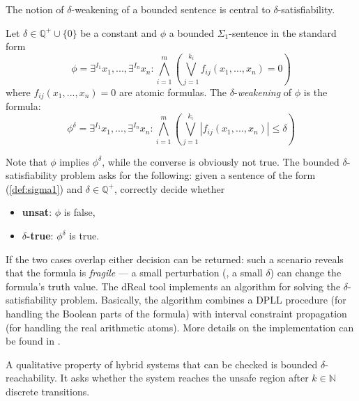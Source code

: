 The notion of $\delta$-weakening \cite{DBLP:conf/lics/GaoAC12} of a bounded sentence is central
to $\delta$-satisfiability.
\begin{definition}
Let $\delta \in \mathbb{Q^+} \cup \{0\}$ be a constant and $\phi$ a bounded $\Sigma_1$-sentence 
in the standard form 
\begin{equation} \label{def:sigma1}
\phi = \exists^{I_{1}} x_{1}, ..., \exists^{I_{n}} x_{n}: \bigwedge^{m}_{i = 1}(\bigvee^{k_i}_{j = 1} f_{ij}(x_{1}, ..., x_{n}) = 0)
\end{equation}
where $f_{ij}(x_{1}, ..., x_{n}) = 0$ are atomic formulas. The $\delta$-{\em weakening} of $\phi$ 
is the formula:
\begin{equation}
\phi^\delta = \exists^{I_{1}} x_{1}, ..., \exists^{I_{n}} x_{n}: \bigwedge^{m}_{i = 1}(\bigvee^{k_i}_{j = 1} |f_{ij}(x_1, ..., x_n)| \le \delta)
\end{equation}
\end{definition}
Note that $\phi$ implies $\phi^\delta$, while the converse is obviously not true.
The bounded $\delta$-satisfiability problem asks for the following: given a sentence of 
the form (\ref{def:sigma1}) and $\delta \in \mathbb{Q^+}$, correctly decide whether
\begin{itemize}
	\item \textbf{unsat}: $\phi$ is false,
	\item \textbf{$\delta$-true}: $\phi^\delta$ is true.
\end{itemize}
If the two cases overlap either decision can be returned: such a scenario reveals that the 
formula is {\em fragile} --- a small perturbation (\ie, a small $\delta$) can change the formula's
truth value. The dReal tool \cite{DBLP:conf/cade/GaoKC13} implements an algorithm for solving 
the $\delta$-satisfiability problem. Basically, the algorithm combines a DPLL procedure \cite{DPLL} 
(for handling the Boolean parts of the formula) with interval constraint propagation \cite{handbookICP}
(for handling the real arithmetic atoms). More details on the implementation can be found 
in \cite{DBLP:conf/cade/GaoKC13}.

A qualitative property of hybrid systems that can be checked is bounded $\delta$-reachability. 
It asks whether the system reaches the unsafe region after $k \in \mathbb{N}$ discrete transitions.


